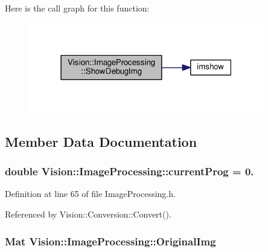 Here is the call graph for this function\+:\nopagebreak
\begin{figure}[H]
\begin{center}
\leavevmode
\includegraphics[width=291pt]{class_vision_1_1_image_processing_a97407ef83de37496d30d6defe3165edd_cgraph}
\end{center}
\end{figure}




\subsection{Member Data Documentation}
\hypertarget{class_vision_1_1_image_processing_ac06b3b9501cde8e742aaf99d986af256}{}
\subsubsection[{current\+Prog}]{\setlength{\rightskip}{0pt plus 5cm}double Vision\+::\+Image\+Processing\+::current\+Prog = 0.}\label{class_vision_1_1_image_processing_ac06b3b9501cde8e742aaf99d986af256}


Definition at line 65 of file Image\+Processing.\+h.



Referenced by Vision\+::\+Conversion\+::\+Convert().

\hypertarget{class_vision_1_1_image_processing_a77c370dab270158a4e9c634e2d3f48e7}{}
\subsubsection[{Original\+Img}]{\setlength{\rightskip}{0pt plus 5cm}Mat Vision\+::\+Image\+Processing\+::\+Original\+Img}\label{class_vision_1_1_image_processing_a77c370dab270158a4e9c634e2d3f48e7}


